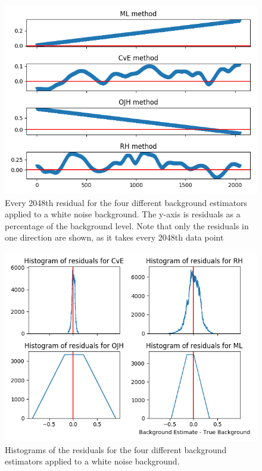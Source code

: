 \documentclass[10pt, a4paper]{article}
\begin{document}
\begin{figure}[h!]
\centering
\includegraphics[width=0.49\textheight]{residual_flatgauss}
\caption{Every 2048th residual for the four different background estimators applied to a white noise background. The y-axis is residuals as a percentage of the background level. Note that only the residuals in one direction are shown, as it takes every 2048th data point}
\label{fig:residual_flatgauss}
\end{figure}

\begin{figure}[h!]
\centering
\includegraphics[width=0.49\textheight]{histogram_flatgauss}
\caption{Histograms of the residuals for the four different background estimators applied to a white noise background.}
\label{fig:histogram_flatgauss}
\end{figure}
\end{document}
